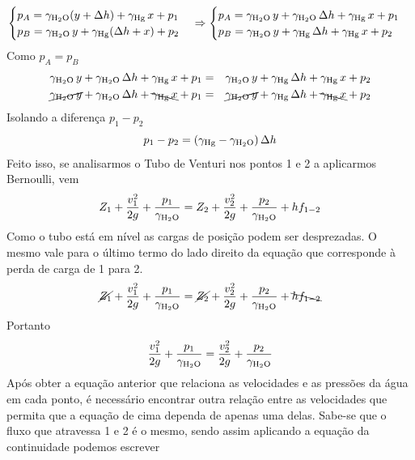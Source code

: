 \documentclass[a4paper, 12pt, brazilian]{article}
\begin{document}
	$$
	\begin{cases}
		p_{A}=\gamma_{\ce{H2O}}(y+\Delta h)+\gamma_{\ce{Hg}}\,x+p_{1}\\
		p_{B}=\gamma_{\ce{H2O}}\,y+\gamma_{\ce{Hg}}(\Delta h+x)+p_{2}
	\end{cases}
	\Rightarrow
	\begin{cases}
		p_{A}=\gamma_{\ce{H2O}}\,y+\gamma_{\ce{H2O}}\,\Delta h+\gamma_{\ce{Hg}}\,x+p_{1}\\
		p_{B}=\gamma_{\ce{H2O}}\,y+\gamma_{\ce{Hg}}\,\Delta h+\gamma_{\ce{Hg}}\,x+p_{2}
	\end{cases}
	$$
	Como $p_{A}=p_{B}$
	\begin{eqnarray}
		\gamma_{\ce{H2O}}\,y+\gamma_{\ce{H2O}}\,\Delta h+\gamma_{\ce{Hg}}\,x+p_{1}&=&\gamma_{\ce{H2O}}\,y+\gamma_{\ce{Hg}}\,\Delta h+\gamma_{\ce{Hg}}\,x+p_{2}\\
		\cancel{\gamma_{\ce{H2O}}\,y}+\gamma_{\ce{H2O}}\,\Delta h+\bcancel{\gamma_{\ce{Hg}}\,x}+p_{1}&=&\cancel{\gamma_{\ce{H2O}}\,y}+\gamma_{\ce{Hg}}\,\Delta h+\bcancel{\gamma_{\ce{Hg}}\,x}+p_{2}
	\end{eqnarray}
	Isolando a diferença $p_{1}-p_{2}$
	\begin{equation}
		\label{eq:ps}
		p_{1}-p_{2}=(\gamma_{\ce{Hg}}-\gamma_{\ce{H2O}})\,\Delta h
	\end{equation}
	Feito isso, se analisarmos o Tubo de Venturi nos pontos 1 e 2 a aplicarmos Bernoulli, vem
	\begin{equation}
		Z_{1}+\dfrac{v_{1}^{2}}{2g}+\dfrac{p_{1}}{\gamma_{\ce{H2O}}}=Z_{2}+\dfrac{v_{2}^{2}}{2g}+\dfrac{p_{2}}{\gamma_{\ce{H2O}}}+hf_{1-2}
	\end{equation}
	Como o tubo está em nível as cargas de posição podem ser desprezadas. O mesmo vale para o último termo do lado direito da equação que corresponde à perda de carga de 1 para 2. 
	\begin{equation}
		\cancel{Z_{1}}+\dfrac{v_{1}^{2}}{2g}+\dfrac{p_{1}}{\gamma_{\ce{H2O}}}=\cancel{Z_{2}}+\dfrac{v_{2}^{2}}{2g}+\dfrac{p_{2}}{\gamma_{\ce{H2O}}}+\bcancel{hf_{1-2}}
	\end{equation}
	Portanto
	\begin{equation}
		\label{eq:vel}
		\dfrac{v_{1}^{2}}{2g}+\dfrac{p_{1}}{\gamma_{\ce{H2O}}}=\dfrac{v_{2}^{2}}{2g}+\dfrac{p_{2}}{\gamma_{\ce{H2O}}}
	\end{equation}
	Após obter a equação anterior que relaciona as velocidades e as pressões da água em cada ponto, é necessário encontrar outra relação entre as velocidades que permita que a equação de cima dependa de apenas uma delas. Sabe-se que o fluxo que atravessa 1 e 2 é o mesmo, sendo assim aplicando a equação da continuidade podemos escrever
\end{document}
